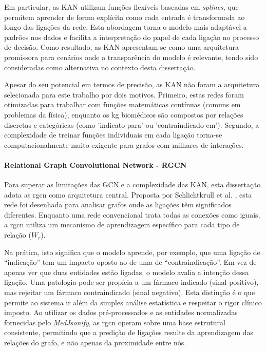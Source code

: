 Em particular, as KAN utilizam funções flexíveis baseadas em \emph{splines}, que permitem aprender de forma explícita como cada entrada é transformada ao longo das ligações da rede. Esta abordagem torna o modelo mais adaptável a padrões nos dados e facilita a interpretação do papel de cada ligação no processo de decisão. Como resultado, as KAN apresentam-se como uma arquitetura promissora para cenários onde a transparência do modelo é relevante, tendo sido consideradas como alternativa no contexto desta dissertação.

Apesar do seu potencial em termos de precisão, as KAN não foram a arquitetura selecionada para este trabalho por dois motivos. Primeiro, estas redes foram otimizadas para trabalhar com funções matemáticas contínuas (comuns em problemas da física), enquanto os \acrshort{kg} biomédicos são compostos por relações discretas e categóricas (como 'indicato para' ou 'contraindicado em'). Segundo, a complexidade de treinar funções individuais em cada ligação torna-se computacionalmente muito exigente para grafos com milhares de interações.

\paragraph{Relational Graph Convolutional Network - RGCN}
Para superar as limitações das GCN e a complexidade das KAN, esta dissertação adota as \acrfull{rgcn} como arquitetura central. Proposta por Schlichtkrull et al. \cite{schlichtkrull2018modeling}, esta rede foi desenhada para analisar grafos onde as ligações têm significados diferentes. Enquanto uma rede convencional trata todas as conexões como iguais, a \acrshort{rgcn} utiliza um mecanismo de aprendizagem específico para cada tipo de relação ($W_r$).

Na prática, isto significa que o modelo aprende, por exemplo, que uma ligação de \enquote{indicação} tem um impacto oposto ao de uma de \enquote{contraindicação}. Em vez de apenas ver que duas entidades estão ligadas, o modelo avalia a intenção dessa ligação. Uma patologia pode ser propícia a um fármaco indicado (sinal positivo), mas rejeitar um fármaco contraindicado (sinal negativo). Esta distinção é o que permite ao sistema ir além da simples análise estatística e respeitar o rigor clínico imposto. Ao utilizar os dados pré-processados e as entidades normalizadas fornecidas pelo \emph{MedJsonify}, as \acrshort{rgcn} operam sobre uma base estrutural consistente, permitindo que a predição de ligações resulte da aprendizagem das relações do grafo, e não apenas da proximidade entre nós.